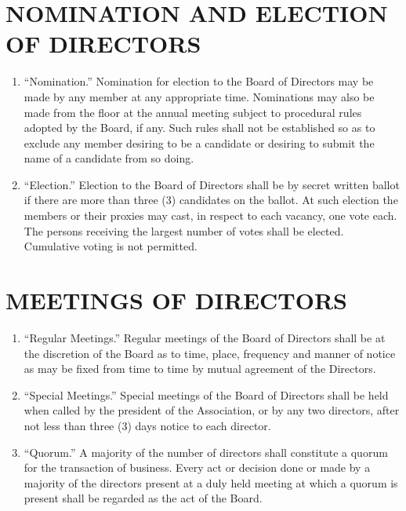 \documentclass[10pt, letterpaper]{article}
\begin{document}
\section{NOMINATION AND ELECTION OF DIRECTORS}
\begin{enumerate}
  \item ``Nomination.''
    Nomination for election to the Board of Directors may be made by any member at any appropriate time.
    Nominations may also be made from the floor at the annual meeting subject to procedural rules adopted by the Board, if any.
    Such rules shall not be established so as to exclude any member desiring to be a candidate or desiring to submit the name of a candidate from so doing.
  \item ``Election.''
    Election to the Board of Directors shall be by secret written ballot if there are more than three (3) candidates on the ballot.  At such election the members or their proxies may cast, in respect to each vacancy, one vote each.
    The persons receiving the largest number of votes shall be elected.
    Cumulative voting is not permitted.
\end{enumerate}

\section{MEETINGS OF DIRECTORS}
\begin{enumerate}
  \item ``Regular Meetings.''
    Regular meetings of the Board of Directors shall be at the discretion of the Board as to time, place, frequency and manner of notice as may be fixed from time to time by mutual agreement of the Directors.
  \item ``Special Meetings.''
    Special meetings of the Board of Directors shall be held when called by the president of the Association, or by any two directors, after not less than three (3) days notice to each director.
  \item ``Quorum.'' A majority of the number of directors shall constitute a quorum for the transaction of business.
    Every act or decision done or made by a majority of the directors present at a duly held meeting at which a quorum is present shall be regarded as the act of the Board.
\end{enumerate}
\end{document}
